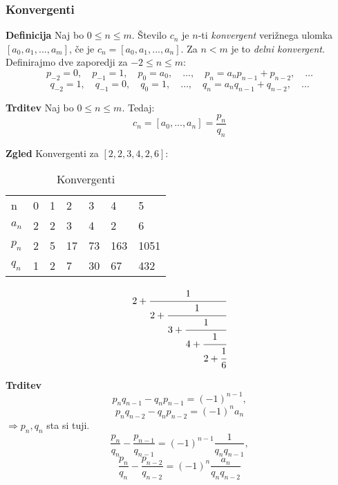 \documentclass{beamer}
\newenvironment{df}{\begin{block}{\textbf{Definicija}}}{\end{block}}
\newenvironment{zg}{\begin{block}{\textbf{Zgled}}}{\end{block}}
\newenvironment{trd}{\begin{block}{\textbf{Trditev}}}{\end{block}}
\begin{document}
\begin{frame}
	\frametitle{Konvergenti}
	\begin{df}
		Naj bo $0 \leq n \leq m$. Število $c_n$ je $n$-ti \textit{konvergent} verižnega ulomka $[a_0, a_1, ..., a_m]$, če je $c_n = [a_0, a_1, ..., a_n]$. Za $n < m$ je to \textit{delni konvergent}.\\
		\vspace{3mm}
		Definirajmo dve zaporedji za $-2\leq n \leq m$:
		\[ p_{-2} = 0, \quad p_{-1} = 1, \quad p_0 = a_0, \quad \dots, \quad p_n = a_{n}p_{n-1} + p_{n-2}, \quad \dots \]
		\[ q_{-2} = 1,\quad q_{-1} = 0,\quad q_0 = 1,\quad \dots,\quad q_n = a_{n}q_{n-1} + q_{n-2},\quad \dots \]
	\end{df}
\pause
	\begin{trd}
	Naj bo $0\leq n \leq m$. Tedaj: \[c_n = [a_0, ..., a_n] = \frac{p_n}{q_n} \]
	\end{trd}
\end{frame}

\begin{frame}
	\begin{zg}
	Konvergenti za $[2, 2, 3, 4, 2, 6]$:
	\begin{table}[]
	\centering
	\caption{Konvergenti}
	\label{Tabela 1}
	\begin{tabular}{l|llllll}
	n    & 0   & 1   & 2    & 3     & 4      & 5        \\
	$a_n$ & 2   & 2   & 3    & 4     & 2      & 6        \\
	$p_n$ & 2   & 5   & 17   & 73    & 163    & 1051     \\
	$q_n$ & 1   & 2   & 7    & 30    & 67     & 432
		\end{tabular}
		\end{table}
		\[ 2 + \cfrac{1}{2 + \cfrac{1}{3+\cfrac{1}{4+\cfrac{1}{2+\cfrac{1}{6}}}}} \]
	\end{zg}
\end{frame}

\begin{frame}
	\begin{trd}
	\[ p_n q_{n-1} - q_n p_{n-1} = (-1)^{n-1}, \] 
	\[ p_n q_{n-2} - q_n p_{n-2} = (-1)^n a_n \] \pause \hspace{4cm}$\Rightarrow p_n, q_n$ sta si tuji. \vspace{5mm} \pause
	\[ \frac{p_n}{q_n} - \frac{p_{n-1}}{q_{n-1}} = (-1)^{n-1}\frac{1}{q_n q_{n-1}}, \]
	\[ \frac{p_n}{q_n} - \frac{p_{n-2}}{q_{n-2}} = (-1)^{n}\frac{a_n}{q_n q_{n-2}} \]
	\end{trd}
\end{frame}
\end{document}
